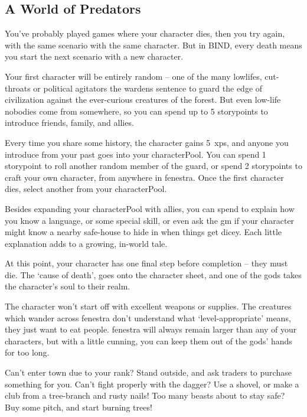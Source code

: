\begin{multicols}{2}

\subsection*{A World of Predators}

You've probably played games where your character dies, then you try again, with the same scenario with the same character.
But in BIND, every death means you start the next scenario with a new character.

Your first character will be entirely random -- one of the many lowlifes, cut-throats or political agitators the \glspl{warden} sentence to guard the \gls{edge} of civilization against the ever-curious creatures of the forest.
But even low-life nobodies come from somewhere, so you can spend up to 5 \glspl{storypoint} to introduce friends, family, and allies.

Every time you share some history, the character gains 5~\glspl{xp}, and anyone you introduce from your past goes into your \gls{characterPool}.
You can spend 1 \gls{storypoint} to roll another random member of the \gls{guard}, or spend 2 \glspl{storypoint} to craft your own character, from anywhere in \gls{fenestra}.
Once the first character dies, select another from your \gls{characterPool}.

Besides expanding your \gls{characterPool} with allies, you can spend  to explain how you know a language, or some special skill, or even ask the \gls{gm} if your character might know a nearby safe-house to hide in when things get dicey.
Each little explanation adds to a growing, in-world tale.

At this point, your character has one final step before completion -- they must die.
The `cause of death', goes onto the character sheet, and one of the gods takes the character's soul to their realm.

The character won't start off with excellent weapons or supplies.
The creatures which wander across \gls{fenestra} don't understand what `level-appropriate' means, they just want to eat people.
\Gls{fenestra} will always remain larger than any of your characters, but with a little cunning, you can keep them out of the gods' hands for too long.

Can't enter town due to your rank?
Stand outside, and ask traders to purchase something for you.
Can't fight properly with the dagger?
Use a shovel, or make a club from a tree-branch and rusty nails!
Too many beasts about to stay safe?
Buy some pitch, and start burning trees!


\end{multicols}
